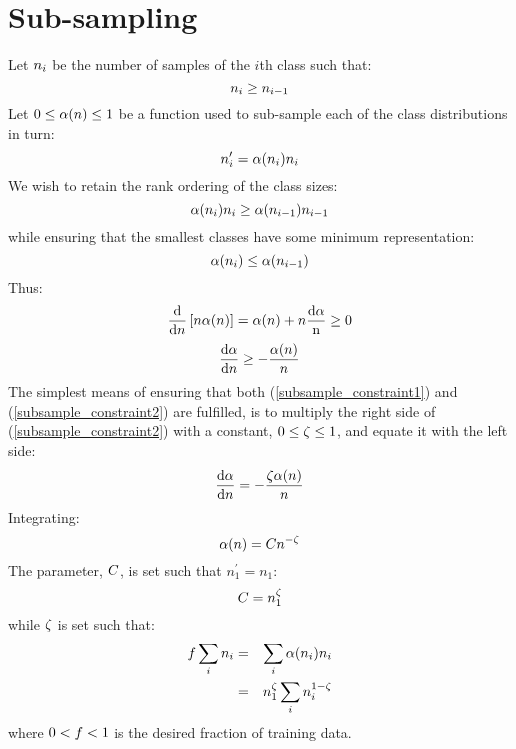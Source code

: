 \section{Sub-sampling}
\label{shuttle_subsampling}

Let $n_i$ be the number of samples of the $i$th class such
that:
\begin{equation*}
n_i \ge n_{i-1}
\end{equation*}
Let $0 \le \alpha(n) \le 1$ be a function used to sub-sample each of the class
distributions in turn:
\begin{equation*}
n_i^\prime = \alpha(n_i) n_i
\end{equation*}
We wish to retain the rank ordering of the class sizes:
\begin{equation*}
\alpha(n_i) n_i 
\ge \alpha(n_{i-1}) n_{i-1} 
\end{equation*}
while ensuring that the smallest classes have some minimum representation:
\begin{equation}
\alpha(n_i) \le \alpha(n_{i-1})
\label{subsample_constraint1}
\end{equation}
Thus:
\begin{equation*}
	\frac{\mathrm d}{\mathrm d n} \left [ n \alpha(n) \right ] = \alpha(n) + n \frac{\mathrm d \alpha}{\mathrm n} \ge 0
\end{equation*}
\begin{equation}
	\frac{\mathrm d \alpha}{\mathrm d n} \ge - \frac{\alpha(n)}{n}
\label{subsample_constraint2}
\end{equation}
The simplest means of ensuring that both (\ref{subsample_constraint1}) and
(\ref{subsample_constraint2}) are fulfilled, is to multiply the right side
of (\ref{subsample_constraint2}) with a constant, $0 \le \zeta \le 1$,
and equate it with the left side:
\begin{equation*}
	\frac{\mathrm d \alpha}{\mathrm d n} = - \frac{\zeta \alpha(n)}{n}
\end{equation*}
Integrating:
\begin{equation*}
	\alpha(n)=C n^{-\zeta}
\end{equation*}
The parameter, 
$C$, is set such that $n_1^\prime=n_1$:
\begin{equation*}
	C = n_1^\zeta
\end{equation*}
while $\zeta$ is set such that:
\begin{eqnarray*}
	f \sum_i n_i & = & \sum_i \alpha(n_i) n_i \\
			      & = & n_1^\zeta \sum_i n_i^{1-\zeta}
\end{eqnarray*}
where $0 < f < 1$ is the desired fraction of training data.

